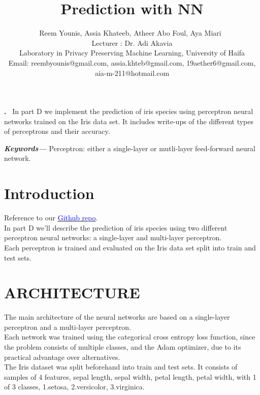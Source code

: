 \documentclass[12pt]{article}
\renewenvironment{abstract}
 {\par\noindent\textbf{\abstractname.}\ \ignorespaces}
 {\par\medskip}
\providecommand{\keywords}[1]
{
  \small	
  \textbf{\textit{Keywords---}} #1
}
\begin{document}
\title{Prediction with NN}


\author{Reem Younis, Assia Khateeb, Atheer Abo Foul, Aya Miari\
\\
Lecturer : Dr. Adi Akavia
\\Laboratory in Privacy Preserving Machine Learning, 
University of Haifa\\
\small{Email: reembyounis@gmail.com, assia.khteb@gmail.com, 19aether6@gmail.com, aia-m-211@hotmail.com}

}
\maketitle
\tableofcontents

\newpage

\begin{abstract}
In part D we implement the prediction of iris species using perceptron neural networks trained on the Iris data set. It includes write-ups of the different types of perceptrons and their accuracy.

\end{abstract}

\keywords{Perceptron: either a single-layer or mutli-layer feed-forward neural network.}



\section{Introduction}
Reference to our \href{https://github.com/assiakhateeb/PPML_lab/tree/main/part\%20D}{\textcolor{blue}{Github repo}}.\\
In part D we'll  describe the                 
prediction of iris species using two different   perceptron neural networks: a single-layer and multi-layer perceptron.\\ Each perceptron is trained and evaluated on the Iris data set split into train and test sets. 

\section{\small{ARCHITECTURE}}
The main architecture of the neural networks are based on a single-layer perceptron and a multi-layer perceptron.\\
Each network was trained using the             
categorical cross entropy loss function, since the problem consists of multiple classes, and the Adam optimizer, due to its practical advantage over alternatives. \\
The Iris dataset was split beforehand into train and test sets. It consists of samples of 4 features, sepal length, sepal width, petal length, petal width, with 1 of 3 classes, 1.setosa,               
2.versicolor,
3.virginica.
\end{document}
